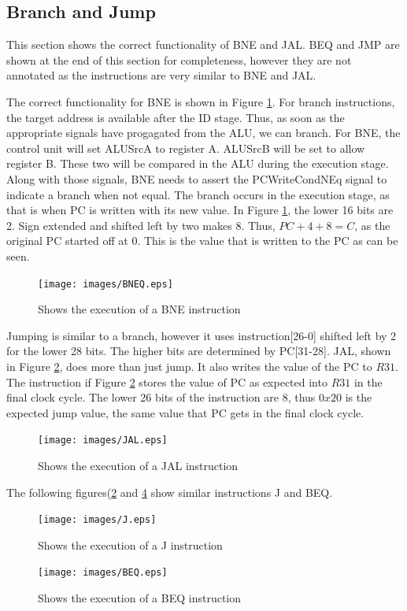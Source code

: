 \documentclass[12pt, a4paper]{article}
\begin{document}
\subsection{Branch and Jump}
This section shows the correct functionality of BNE and JAL. BEQ and JMP are shown at the end of this
section for completeness, however they are not annotated as the instructions are very similar to BNE
and JAL.

The correct functionality for BNE is shown in Figure \ref{fig:bne}. For branch instructions, the
target address is available after the ID stage. Thus, as soon as the appropriate signals have progagated
from the ALU, we can branch. For BNE, the control unit will set ALUSrcA to register A. ALUSrcB will
be set to allow register B. These two will be compared in the ALU during the execution stage. Along
with those signals, BNE needs to assert the PCWriteCondNEq signal to indicate a branch when not equal.
The branch occurs in the execution stage, as that is when PC is written with its new value. In Figure
\ref{fig:bne}, the lower 16 bits are 2. Sign extended and shifted left by two makes 8. Thus, $PC + 4 + 8 = C$,
as the original PC started off at 0. This is the value that is written to the PC as can be seen.
\begin{figure}[H]
  \centering
  \texttt{[image: images/BNEQ.eps]}
  \caption{Shows the execution of a BNE instruction}
  \label{fig:bne}
\end{figure}

Jumping is similar to a branch, however it uses instruction[26-0] shifted left by 2 for the lower 28 bits.
The higher bits are determined by PC[31-28]. JAL, shown in Figure \ref{fig:jal}, does more than just jump.
It also writes the value of the PC to $R31$. The instruction if Figure \ref{fig:jal} stores the value of
PC as expected into $R31$ in the final clock cycle. The lower 26 bits of the instruction are 8, thus $0x20$
is the expected jump value, the same value that PC gets in the final clock cycle.

\begin{figure}[H]
  \centering
  \texttt{[image: images/JAL.eps]}
  \caption{Shows the execution of a JAL instruction}
  \label{fig:jal}
\end{figure}

The following figures(\ref{fig:jal} and \ref{fig:beq} show similar instructions J and BEQ.
\begin{figure}[H]
  \centering
  \texttt{[image: images/J.eps]}
  \caption{Shows the execution of a J instruction}
  \label{fig:j}
\end{figure}
\begin{figure}[H]
  \centering
  \texttt{[image: images/BEQ.eps]}
  \caption{Shows the execution of a BEQ instruction}
  \label{fig:beq}
\end{figure}
\end{document}
